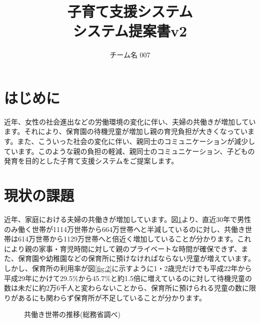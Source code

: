 \documentclass[a4j]{jarticle}
\title{
\vspace{30mm}
{\bf 子育て支援システム}
\\
\vspace{5mm}
{\bf システム提案書v2\\
}
\vspace{120mm}
}
\author{
\vspace{5mm}
チーム名 007\\
\vspace{5mm}
}
\begin{document}
\maketitle
\tableofcontents
\newpage

\section{はじめに}
近年、女性の社会進出などの労働環境の変化に伴い、夫婦の共働きが増加しています。それにより、保育園の待機児童が増加し親の育児負担が大きくなっています。また、こういった社会の変化に伴い、親同士のコミュニケーションが減少しています。このような親の負担の軽減、親同士のコミュニケーション、子どもの発育を目的とした子育て支援システムをご提案します。

\section{現状の課題}
近年、家庭における夫婦の共働きが増加しています。図\ref{fig:1}より、直近30年で男性のみ働く世帯が1114万世帯から664万世帯へと半減しているのに対し、共働き世帯は614万世帯から1129万世帯へと倍近く増加していることが分かります\cite{bib:tomo}。これにより親の家事・育児時間に対して親のプライベートな時間が確保できず、また、保育園や幼稚園などの保育所に預けなければならない児童が増えています。しかし、保育所の利用率が図\ref{fig:2}に示すように1・2歳児だけでも平成22年から平成29年にかけて29.5\%から45.7\%と約1.5倍に増えているのに対して待機児童の数は未だに約2万6千人と変わらないことから、保育所に預けられる児童の数に限りがあるにも関わらず保育所が不足していることが分かります\cite{bib:taiki}。
\begin{figure}[H]
\begin{center}
\caption{共働き世帯の推移(総務省調べ)}
\label{fig:1}
\end{center}
\end{figure}
\end{document}
